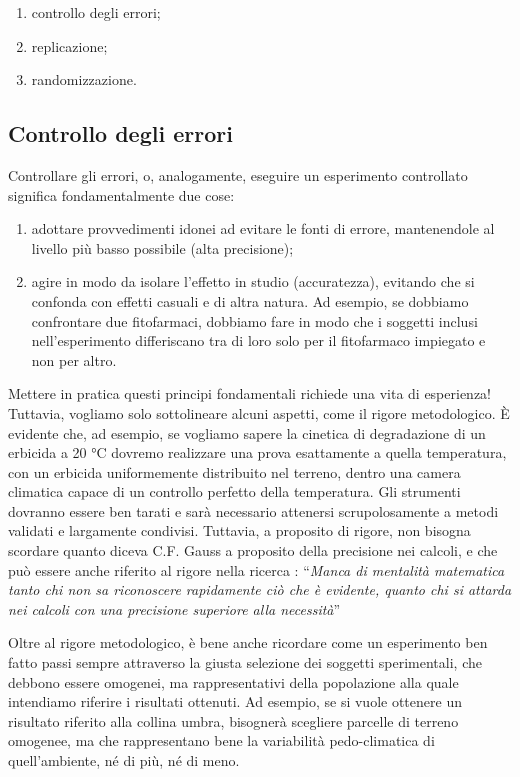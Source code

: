 \documentclass[a4paper,12pt,oneside]{book}
\providecommand{\tightlist}{%
  \setlength{\itemsep}{0pt}\setlength{\parskip}{0pt}}
\begin{document}
\begin{enumerate}
\def\labelenumi{\arabic{enumi}.}
\tightlist
\item
  controllo degli errori;
\item
  replicazione;
\item
  randomizzazione.
\end{enumerate}

\hypertarget{controllo-degli-errori}{%
\subsection{Controllo degli errori}\label{controllo-degli-errori}}

Controllare gli errori, o, analogamente, eseguire un esperimento controllato significa fondamentalmente due cose:

\begin{enumerate}
\def\labelenumi{\arabic{enumi}.}
\tightlist
\item
  adottare provvedimenti idonei ad evitare le fonti di errore, mantenendole al livello più basso possibile (alta precisione);
\item
  agire in modo da isolare l'effetto in studio (accuratezza), evitando che si confonda con effetti casuali e di altra natura. Ad esempio, se dobbiamo confrontare due fitofarmaci, dobbiamo fare in modo che i soggetti inclusi nell'esperimento differiscano tra di loro solo per il fitofarmaco impiegato e non per altro.
\end{enumerate}

Mettere in pratica questi principi fondamentali richiede una vita di esperienza! Tuttavia, vogliamo solo sottolineare alcuni aspetti, come il rigore metodologico. È evidente che, ad esempio, se vogliamo sapere la cinetica di degradazione di un erbicida a 20 °C dovremo realizzare una prova esattamente a quella temperatura, con un erbicida uniformemente distribuito nel terreno, dentro una camera climatica capace di un controllo perfetto della temperatura. Gli strumenti dovranno essere ben tarati e sarà necessario attenersi scrupolosamente a metodi validati e largamente condivisi. Tuttavia, a proposito di rigore, non bisogna scordare quanto diceva C.F. Gauss a proposito della precisione nei calcoli, e che può essere anche riferito al rigore nella ricerca : ``\emph{Manca di mentalità matematica tanto chi non sa riconoscere rapidamente ciò che è evidente, quanto chi si attarda nei calcoli con una precisione superiore alla necessità}''

Oltre al rigore metodologico, è bene anche ricordare come un esperimento ben fatto passi sempre attraverso la giusta selezione dei soggetti sperimentali, che debbono essere omogenei, ma rappresentativi della popolazione alla quale intendiamo riferire i risultati ottenuti. Ad esempio, se si vuole ottenere un risultato riferito alla collina umbra, bisognerà scegliere parcelle di terreno omogenee, ma che rappresentano bene la variabilità pedo-climatica di quell'ambiente, né di più, né di meno.
\end{document}
